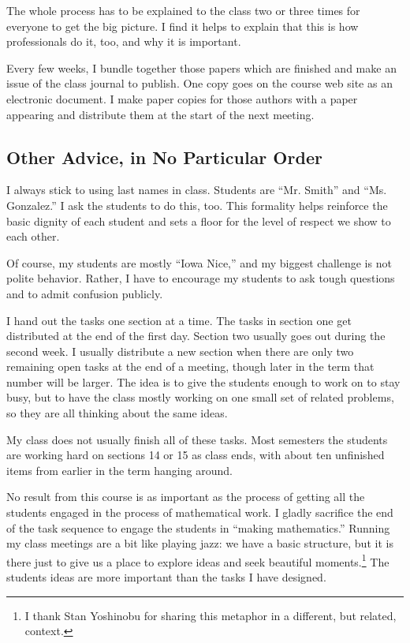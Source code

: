 \documentclass{tufte-handout}
\theoremstyle{definition}
\begin{document}
The whole process has to be explained to the class two or three times for everyone to get the big picture. I find it helps to explain that this is how professionals do it, too, and why it is important.

Every few weeks, I bundle together those papers which are finished and make an issue of the class journal to publish. One copy goes on the course web site as an electronic document. I make paper copies for those authors with a paper appearing and distribute them at the start of the next meeting.


\subsection{Other Advice, in No Particular Order}

I always stick to using last names in class. Students are ``Mr. Smith'' and ``Ms. Gonzalez.'' I ask the students to do this, too. This formality helps reinforce the basic dignity of each student and sets a floor for the level of respect we show to each other.

Of course, my students are mostly ``Iowa Nice,'' and my biggest challenge is not polite behavior. Rather, I have to encourage my students to ask tough questions and to admit confusion publicly.

I hand out the tasks one section at a time. The tasks in section one get distributed at the end of the first day. Section two usually goes out during the second week. I usually distribute a new section when there are only two remaining open tasks at the end of a meeting, though later in the term that number will be larger. The idea is to give the students enough to work on to stay busy, but to have the class mostly working on one small set of related problems, so they are all thinking about the same ideas.

My class does not usually finish all of these tasks. Most semesters the students are working hard on sections 14 or 15 as class ends, with about ten unfinished items from earlier in the term hanging around.

No result from this course is as important as the process of getting all the students engaged in the process of mathematical work. I gladly sacrifice the end of the task sequence to engage the students in ``making mathematics.'' Running my class meetings are a bit like playing jazz: we have a basic structure, but it is there just to give us a place to explore ideas and seek beautiful moments.\footnote{I thank Stan Yoshinobu for sharing this metaphor in a different, but related, context.} The students ideas are more important than the tasks I have designed.
\end{document}
